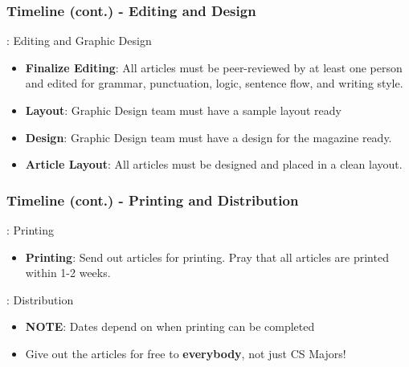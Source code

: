 \documentclass{beamer}
\begin{document}
\begin{frame}
    \frametitle{Timeline (cont.) - Editing and Design}
        
        \begin{description}
            \item<1->[Weeks 7-8 (October 12 to October 23)]: Editing and Graphic Design
                \begin{itemize}
                    \item<2-> \textbf{Finalize Editing}: All articles must be peer-reviewed by at least one person and edited for grammar, punctuation, logic, sentence flow, and writing style.
                    \item<3-> \textbf{Layout}: Graphic Design team must have a sample layout ready
                    \item<4-> \textbf{Design}: Graphic Design team must have a design for the magazine ready.
                    \item<5-> \textbf{Article Layout}: All articles must be designed and placed in a clean layout.
                \end{itemize}
        \end{description}
\end{frame}

\begin{frame}
    \frametitle{Timeline (cont.) - Printing and Distribution}

        \begin{description}
            \item<1->[Week 9 (October 26 to October 30)]: Printing
                \begin{itemize}
                    \item<2-> \textbf{Printing}: Send out articles for printing. Pray that all articles are printed within 1-2 weeks.
                \end{itemize}


            \item<3->[Weeks 10-12 (November 2 to November 20)]: Distribution 
                \begin{itemize}
                    \item<4-> \textbf{NOTE}: Dates depend on when printing can be completed
                    \item<5-> Give out the articles for free to \textbf{everybody}, not just CS Majors!
                \end{itemize}
        \end{description}

\end{frame}
\end{document}
